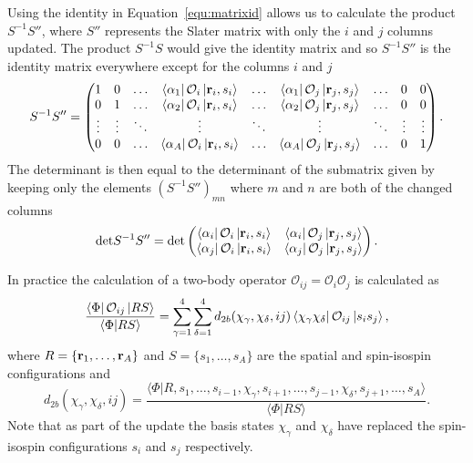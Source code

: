 Using the identity in Equation~\ref{equ:matrixid} allows us to calculate the product $S^{-1}S''$, where $S''$ represents the Slater matrix with only the $i$ and $j$ columns updated. The product $S^{-1}S$ would give the identity matrix and so $S^{-1}S''$ is the identity matrix everywhere except for the columns $i$ and $j$
\begin{equation}
   S^{-1}S'' = 
   \begin{pmatrix}
      1 & 0 & \ldots & \left< \alpha_1 \right|\mathcal{O}_i\left| \mathbf{r}_i,s_i \right> & \ldots & \left< \alpha_1 \right|\mathcal{O}_j\left| \mathbf{r}_j,s_j \right> & \ldots & 0 & 0 \\
      0 & 1 & \ldots & \left< \alpha_2 \right|\mathcal{O}_i\left| \mathbf{r}_i,s_i \right> & \ldots & \left< \alpha_2 \right|\mathcal{O}_j\left| \mathbf{r}_j,s_j \right> & \ldots & 0 & 0 \\
      \vdots & \vdots & \ddots & \vdots & \ddots & \vdots & \ddots & \vdots & \vdots \\
      0 & 0 & \ldots & \left< \alpha_A \right|\mathcal{O}_i\left| \mathbf{r}_i,s_i \right> & \ldots & \left< \alpha_A \right|\mathcal{O}_j\left| \mathbf{r}_j,s_j \right> & \ldots & 0 & 1 \\
   \end{pmatrix}.
\end{equation}
The determinant is then equal to the determinant of the submatrix given by keeping only the elements $\left(S^{-1}S''\right)_{mn}$ where $m$ and $n$ are both of the changed columns
\begin{equation}
   \mathrm{det}{S^{-1}S''} =
   \mathrm{det}\begin{pmatrix}
      \left< \alpha_i \right|\mathcal{O}_i\left| \mathbf{r}_i,s_i \right> & \left< \alpha_i \right|\mathcal{O}_j\left| \mathbf{r}_j,s_j \right> \\
      \left< \alpha_j \right|\mathcal{O}_i\left| \mathbf{r}_i,s_i \right> & \left< \alpha_j \right|\mathcal{O}_j\left| \mathbf{r}_j,s_j \right> \\
   \end{pmatrix}.
\end{equation}

In practice the calculation of a two-body operator $\mathcal{O}_{ij}=\mathcal{O}_i\mathcal{O}_j$ is calculated as
\begin{equation}
   \frac{\left< \Phi \right|\mathcal{O}_{ij}\left| RS \right>}{\left< \Phi | RS \right>} = \sum\limits_{\gamma=1}^4\sum\limits_{\delta=1}^4 d_{2b}(\chi_\gamma,\chi_\delta,ij)\left< \chi_\gamma\chi_\delta \right|\mathcal{O}_{ij}\left| s_is_j \right>,
   \label{equ:d2bdef}
\end{equation}
where $R=\{\mathbf{r}_1,\ldots,\mathbf{r}_A\}$ and $S=\{s_1,\ldots,s_A\}$ are the spatial and spin-isospin configurations and
\begin{equation}
   d_{2b}(\chi_\gamma,\chi_\delta,ij)=\frac{\langle\Phi|R,s_1,\ldots,s_{i-1},\chi_\gamma,s_{i+1},\ldots,s_{j-1},\chi_\delta,s_{j+1},\ldots,s_A\rangle}{\langle \Phi|RS\rangle}.
\end{equation}
Note that as part of the update the basis states $\chi_\gamma$ and $\chi_\delta$ have replaced the spin-isospin configurations $s_i$ and $s_j$ respectively.

